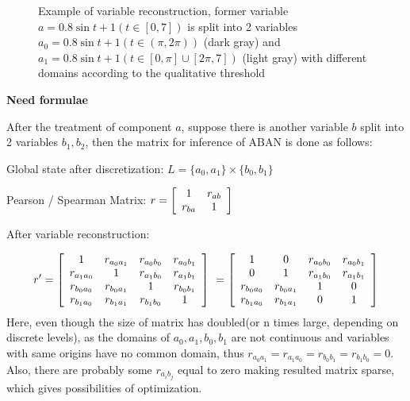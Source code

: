 \begin{figure}[ht]
\centering
{}
\caption[Variable reconstruction]{Example of variable reconstruction, former variable $a=0.8\sin t+1(t\in [0,7])$ is split into 2 variables $a_0=0.8\sin t+1(t\in (\pi,2\pi))$ (dark gray) and $a_1=0.8\sin t+1(t\in [0,\pi]\cup[2\pi,7])$ (light gray) with different domains according to the qualitative threshold}\label{varRec}
\end{figure}

\textbf{Need formulae}

After the treatment of component $a$, suppose there is another variable $b$ split into 2 variables $b_1,b_2$, then the matrix for inference of ABAN is done as follows:

Global state after discretization: $L=\{a_0,a_1\}\times \{b_0,b_1\}\ $

Pearson / Spearman Matrix: $r=\left[
\begin{array}{*{20}c}
1 & r_{ab}\\
r_{ba} & 1 \\
\end{array}
\right]\ 
$

After variable reconstruction:

$$r'=\left[
\begin{array}{*{20}c}
1 & r_{a_0a_1}& r_{a_0b_0}&r_{a_0b_1}\\
r_{a_1a_0} & 1& r_{a_1b_0}&r_{a_1b_1}\\
r_{b_0a_0} & r_{b_0a_1}& 1&r_{b_0b_1}\\
r_{b_1a_0} & r_{b_1a_1}& r_{b_1b_0}&1\\
\end{array}
\right]\ =\left[\begin{array}{*{20}c}
1 & 0& r_{a_0b_0}&r_{a_0b_1}\\
0 & 1& r_{a_1b_0}&r_{a_1b_1}\\
r_{b_0a_0} & r_{b_0a_1}& 1&0\\
r_{b_1a_0} & r_{b_1a_1}& 0&1\\
\end{array}\right]$$
Here, even though the size of matrix has doubled(or n times large, depending on discrete levels), as the domains of $a_0,a_1,b_0,b_1$ are not continuous and variables with same origins have no common domain, thus $r_{a_0a_1}=r_{a_1a_0}=r_{b_0b_1}=r_{b_1b_0}=0$. Also, there are probably some $r_{a_ib_j}$ equal to zero making resulted matrix sparse, which gives possibilities of optimization.
